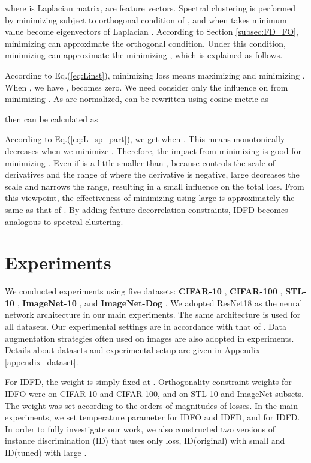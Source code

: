 \documentclass{article} \usepackage{iclr2021_conference,times}
\begin{document}
where  is Laplacian matrix,  are feature vectors.
Spectral clustering is performed by minimizing  subject to orthogonal condition of , and
when  takes minimum value  become eigenvectors of Laplacian .
According to Section \ref{subsec:FD_FO}, minimizing  can approximate the orthogonal condition.
Under this condition, minimizing  can approximate the minimizing , which is explained as follows.
 
According to Eq.(\ref{eq:Linst}), minimizing loss  means maximizing  and minimizing .
When , we have ,  becomes zero.
We need consider only the influence on  from minimizing .
As  are normalized,  can be rewritten using cosine metric as

then  can be calculated as


According to Eq.(\ref{eq:L_sp_part}), we get  when .
This means  monotonically decreases when we minimize .
Therefore, the impact from minimizing  is good for minimizing .
Even if  is a little smaller than ,
because  controls the scale of derivatives and the range of  where the derivative is negative, large  decreases the scale and  narrows the range,
resulting in a small influence on the total loss.
From this viewpoint, the effectiveness of minimizing  using large  is approximately the same as that of . By adding feature decorrelation constraints, IDFD becomes analogous to spectral clustering.


\section{Experiments}
\label{Experiments}
We conducted experiments using five datasets:
{\bf CIFAR-10} \cite{krizhevsky2009learning}, {\bf CIFAR-100} \cite{krizhevsky2009learning}, {\bf STL-10} \cite{coates2011analysis}, {\bf ImageNet-10} \cite{deng2009imagenet}, and {\bf ImageNet-Dog} \cite{deng2009imagenet}. We adopted ResNet18 \cite{He2015} as the neural network architecture in our main experiments. 
The same architecture is used for all datasets. Our experimental settings are in accordance with that of \cite{wu2018unsupervised}. Data augmentation strategies often used on images are also adopted in experiments. Details about datasets and experimental setup are given in Appendix \ref{appendix_dataset}. 

For IDFD, the weight  is simply fixed at . Orthogonality constraint weights for IDFO were  on CIFAR-10 and CIFAR-100, and  on STL-10 and ImageNet subsets. The weight  was set according to the orders of magnitudes of losses. In the main experiments, we set temperature parameter  for IDFO and IDFD, and  for IDFD. In order to fully investigate our work, we also constructed two versions of instance discrimination (ID) that uses only  loss, ID(original) with small  and ID(tuned) with large .
\end{document}
